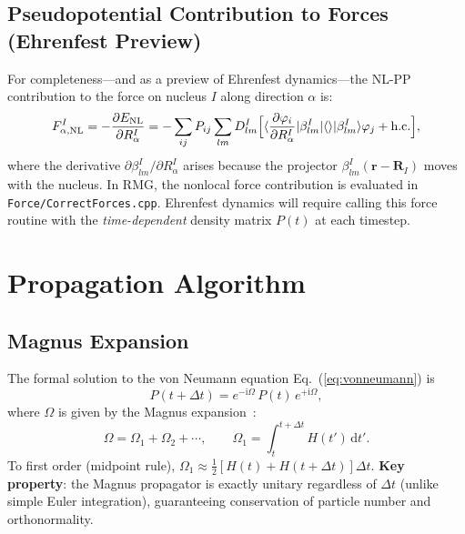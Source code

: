 \documentclass[12pt,letterpaper]{article}
\newcommand{\braket}[2]{\langle #1 \vert #2 \rangle}
\newcommand{\mel}[3]{\langle #1 \vert #2 \vert #3 \rangle}
\newcommand{\dd}{\mathrm{d}}
\newcommand{\ii}{\mathrm{i}}
\begin{document}
\subsection{Pseudopotential Contribution to Forces (Ehrenfest Preview)}
\label{sec:pp:forces}

For completeness---and as a preview of Ehrenfest dynamics---the NL-PP
contribution to the force on nucleus $I$ along direction $\alpha$ is:
\begin{equation}
  F^I_{\alpha,\rm NL} = -\frac{\partial E_{\rm NL}}{\partial R^I_\alpha}
  = -\sum_{ij} P_{ij}\sum_{lm} D^I_{lm}
    \Bigl[
      \mel{\frac{\partial\varphi_i}{\partial R^I_\alpha}}{\beta^I_{lm}}\braket{\beta^I_{lm}}{\varphi_j}
      + \text{h.c.}
    \Bigr],
  \label{eq:nlpp_force}
\end{equation}
where the derivative $\partial\beta^I_{lm}/\partial R^I_\alpha$ arises because
the projector $\beta^I_{lm}(\bm{r}-\bm{R}_I)$ moves with the nucleus.
In RMG, the nonlocal force contribution is evaluated in \texttt{Force/CorrectForces.cpp}.
Ehrenfest dynamics will require calling this force routine with the
\emph{time-dependent} density matrix $P(t)$ at each timestep.

\section{Propagation Algorithm}
\label{sec:algorithm}

\subsection{Magnus Expansion}
\label{sec:magnus}

The formal solution to the von Neumann equation Eq.~(\ref{eq:vonneumann}) is
\begin{equation}
  P(t+\Delta t) = e^{-\ii\Omega}\,P(t)\,e^{+\ii\Omega},
\end{equation}
where $\Omega$ is given by the Magnus expansion~\cite{Magnus1954}:
\begin{equation}
  \Omega = \Omega_1 + \Omega_2 + \cdots,
  \qquad
  \Omega_1 = \int_t^{t+\Delta t}\!\! H(t')\,\dd t'.
\end{equation}
To first order (midpoint rule), $\Omega_1 \approx \tfrac{1}{2}[H(t)+H(t+\Delta t)]\Delta t$.
\textbf{Key property}: the Magnus propagator is exactly unitary regardless of
$\Delta t$ (unlike simple Euler integration), guaranteeing conservation of
particle number and orthonormality.
\end{document}
